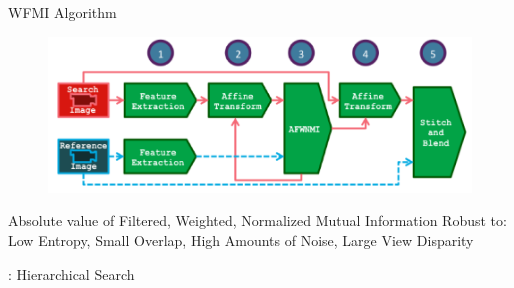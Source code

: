 \documentclass[serif]{beamer}
\begin{document}
\begin{frame}[c]{\sc WFMI Algorithm}

\begin{figure}
\centering
\includegraphics[width=1\columnwidth]{FlowchartHorizontal}
\label{Flowchart}
\end{figure}

\begin{block}{\footnotesize {\color{yellow}A}bsolute value of {\color{yellow}F}iltered, {\color{yellow}W}eighted, {\color{yellow}N}ormalized {\color{yellow}M}utual {\color{yellow}I}nformation}
Robust to: Low Entropy, Small Overlap, High Amounts of Noise, Large View Disparity
\end{block}


\end{frame}


\begin{frame}[c]{: Hierarchical Search}







\end{frame}
\end{document}
